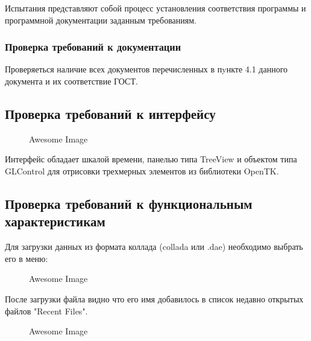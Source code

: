 Испытания представляют собой процесс установления соответствия программы и
программной документации заданным требованиям.

\subsubsection{Проверка требований к документации}
Проверяеться наличие всех документов перечисленных в пyнкте 4.1 данного документа и их соответствие ГОСТ.


\subsection{Проверка требований к интерфейсу}

\begin{figure}[h!]
    \centering
    \caption{Awesome Image}
    \label{fig:awesome_image}
\end{figure}

Интерфейс обладает шкалой времени, панелью типа TreeView и объектом типа GLControl для отрисовки трехмерных элементов из библиотеки OpenTK.



\subsection{Проверка требований к функциональным характеристикам}
Для загрузки данных из формата коллада (collada или .dae) необходимо выбрать его в меню:

\begin{figure}[h!]
    \centering
    \caption{Awesome Image}
    \label{fig:awesome_image}
\end{figure}



После загрузки файла видно что его имя добавилось в список недавно открытых файлов "Recent Files".

\begin{figure}[h!]
    \centering
    \caption{Awesome Image}
    \label{fig:awesome_image}
\end{figure}



